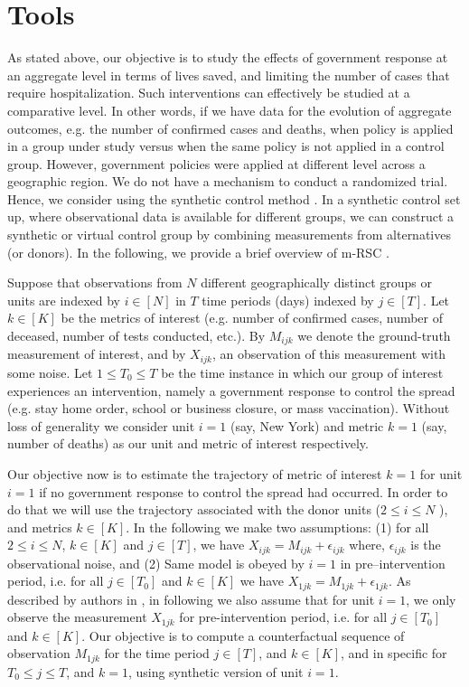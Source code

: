 \documentclass[final,authoryear,5p,times,twocolumn]{elsarticle}
\begin{document}
	\section{Tools}
	\label{SEC2}
	As stated above, our objective is to study the effects of government response at an aggregate level in terms of lives saved, and limiting the number of cases that require hospitalization. Such interventions can effectively be studied at a comparative level. In other words, if we have data for the evolution of aggregate outcomes, e.g. the number of confirmed cases and deaths, when policy is applied in a group under study versus when the same policy is not applied in a control group. However, government policies were applied at different level across a geographic region.  We do not have a mechanism to conduct a randomized trial. Hence, we consider using the synthetic control method \cite{ap08746, JMLR18, AMSS19}. In a synthetic control set up, where observational data is available for different groups, we can construct a synthetic or virtual control group by combining measurements from alternatives (or donors). In the following, we provide a brief overview of m-RSC \cite{AMSS19}.\par
	
	Suppose that observations from $N$ different geographically distinct groups or units are indexed by $i \in [N]$ in $T$ time periods (days) indexed by $j \in [T]$. Let $k \in [K]$ be the metrics of interest (e.g. number of confirmed cases, number of deceased, number of tests conducted, etc.). By $M_{ijk}$ we denote the ground-truth measurement of interest, and by $X_{ijk}$, an observation of this measurement with some noise. Let $1 \leq T_0 \leq T$ be the time instance in which our group of interest experiences an intervention, namely a government response to control the spread (e.g. stay home order, school or business closure, or mass vaccination). Without loss of generality we consider unit $i = 1$ (say, New York) and metric $k = 1$ (say, number of deaths) as our unit and metric of interest respectively.\par
	
	Our objective now is to estimate the trajectory of metric of interest $k = 1$  for unit $i = 1$ if no government response to control the spread had occurred. In order to do that we will use the trajectory associated with the donor units ($2 \leq i \leq N$ ), and metrics $k \in [K ]$. In the following we make two assumptions: (1) for all $2 \leq i \leq N$, $k \in [K]$ and $j \in [T]$, we have  $X_{ijk} = M_{ijk} + \epsilon_{ijk}$ where, $\epsilon_{ijk}$ is the observational noise, and (2) Same model is obeyed by $i=1$ in pre--intervention period, i.e. for all $j \in [T_0]$ and $k \in [K]$ we have $X_{1jk} = M_{1jk} + \epsilon_{1jk}$. As described by authors in \cite{AMSS19}, in following we also assume that for unit $i=1$, we only observe the measurement $X_{1jk}$ for pre-intervention period, i.e. for all $j \in [T_0]$ and $k \in [K]$. Our objective is to compute a counterfactual sequence of observation $M_{1jk}$ for the time period $j \in [T]$, and $k \in [K]$, and in specific for $T_0 \leq j \leq T$, and $k = 1$, using synthetic version of unit $i=1$.\par
	
\end{document}
